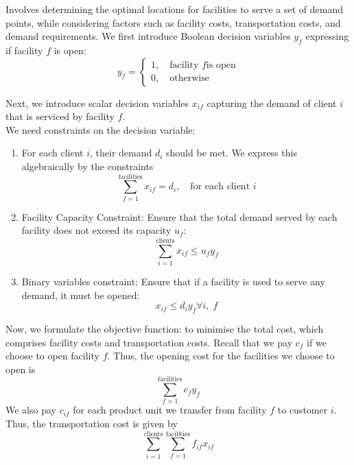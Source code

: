 \documentclass{article}
\begin{document}
Involves determining the optimal locations for facilities to serve a set of demand points, while considering factors such as facility costs, transportation costs, and demand requirements. We first introduce Boolean decision variables $y_f$ expressing if facility $f$ is open: \begin{equation*}
    y_f = \begin{cases}
        1, \quad \text{facility } f \text{is open} \\ 
        0, \quad \text{otherwise}
    \end{cases}
\end{equation*}

\noindent Next, we introduce scalar decision variables $x_{if}$ capturing the demand of client $i$ that is serviced by facility $f$. \\

\noindent We need constraints on the decision variable: \begin{enumerate}
    \item For each client $i$, their demand $d_i$ should be met. We express this algebraically by the constraints \begin{equation*}
        \sum_{f=1}^{\text{facilities}} x_{if}  = d_i, \quad \text{for each client } i
    \end{equation*}
    \item Facility Capacity Constraint: Ensure that the total demand served by each facility does not exceed its capacity $u_f$: \begin{equation*}
        \sum_{i=1}^{\text{clients}} x_{if} \leq u_f y_f
    \end{equation*}
    \item Binary variables constraint: Ensure that if a facility is used to serve any demand, it must be opened: \begin{equation*}
        x_{if} \leq d_i y_f \forall i, \; f
    \end{equation*}

\end{enumerate}

\noindent Now, we formulate the objective function: to minimise the total cost, which comprises facility costs and transportation costs. Recall that we pay $c_f$ if we choose to open facility $f$. Thus, the opening cost for the facilities we choose to open is \begin{equation*}
    \sum_{f=1}^{\text{facilities}} c_f y_f 
\end{equation*} We also pay $c_{if}$ for each product unit we transfer from facility $f$ to customer $i$. Thus, the transportation cost is given by \begin{equation*}
    \sum_{i=1}^{\text{clients}} \sum_{f=1}^{\text{facilities}} f_{if} x_{if} 
\end{equation*}
\end{document}
